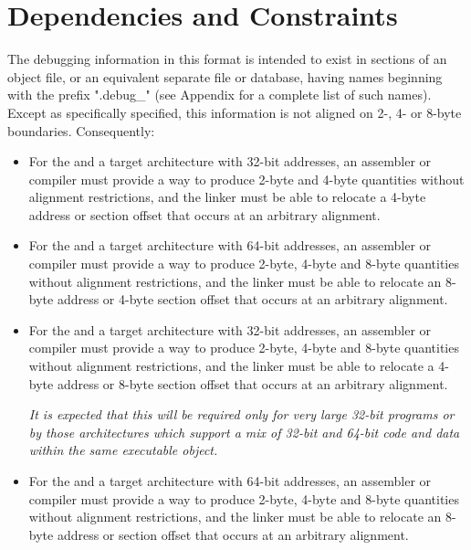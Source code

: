 \section{Dependencies and Constraints}
\label{datarep:dependenciesandconstraints}
The debugging information in this format is intended to
exist in sections of an object file, or an equivalent
separate file or database, having names beginning with
the prefix ".debug\_" (see Appendix 
for a complete list of such names). 
Except as specifically specified, this information is not 
aligned on 2-, 4- or 8-byte boundaries. Consequently:

\begin{itemize}
\item For the \thirtytwobitdwarfformat{} and a target architecture with
32-bit addresses, an assembler or compiler must provide a way
to produce 2-byte and 4-byte quantities without alignment
restrictions, and the linker must be able to relocate a
4-byte address or 
section offset that occurs at an arbitrary
alignment.

\item For the \thirtytwobitdwarfformat{} and a target architecture with
64-bit addresses, an assembler or compiler must provide a
way to produce 2-byte, 4-byte and 8-byte quantities without
alignment restrictions, and the linker must be able to relocate
an 8-byte address or 4-byte 
section offset that occurs at an
arbitrary alignment.

\item For the \sixtyfourbitdwarfformat{} and a target architecture with
32-bit addresses, an assembler or compiler must provide a
way to produce 2-byte, 4-byte and 8-byte quantities without
alignment restrictions, and the linker must be able to relocate
a 4-byte address or 8-byte 
section offset that occurs at an
arbitrary alignment.

\textit{It is expected that this will be required only for very large
32-bit programs or by those architectures which support
a mix of 32-bit and 64-bit code and data within the same
executable object.}

\item For the \sixtyfourbitdwarfformat{} and a target architecture with
64-bit addresses, an assembler or compiler must provide a
way to produce 2-byte, 4-byte and 8-byte quantities without
alignment restrictions, and the linker must be able to
relocate an 8-byte address or 
section offset that occurs at
an arbitrary alignment.
\end{itemize}

